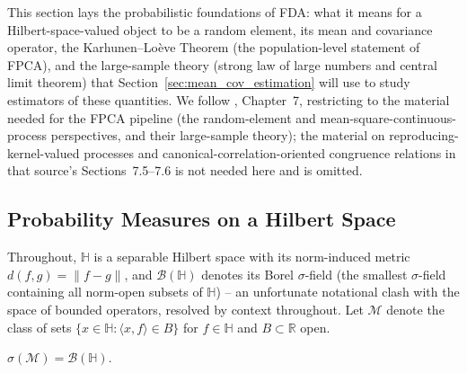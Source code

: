This section lays the probabilistic foundations of FDA: what it means for
a Hilbert-space-valued object to be a random element, its mean and
covariance operator, the Karhunen--Lo\`eve Theorem (the population-level
statement of FPCA), and the large-sample theory (strong law of large
numbers and central limit theorem) that Section~\ref{sec:mean_cov_estimation}
will use to study estimators of these quantities. We follow
\cite{hsingeubank2015}, Chapter~7, restricting to the material needed for
the FPCA pipeline (the random-element and mean-square-continuous-process
perspectives, and their large-sample theory); the material on
reproducing-kernel-valued processes and canonical-correlation-oriented
congruence relations in that source's Sections~7.5--7.6 is not needed here
and is omitted.

\subsection{Probability Measures on a Hilbert Space}
\label{subsec:prob_measures}

Throughout, $\mathbb{H}$ is a separable Hilbert space with its norm-induced
metric $d(f,g)=\|f-g\|$, and $\mathcal{B}(\mathbb{H})$ denotes its Borel
$\sigma$-field (the smallest $\sigma$-field containing all norm-open
subsets of $\mathbb{H}$) -- an unfortunate notational clash with the space
of bounded operators, resolved by context throughout. Let $\mathcal{M}$
denote the class of sets $\{x\in\mathbb{H}:\langle x,f\rangle\in B\}$ for
$f\in\mathbb{H}$ and $B\subset\mathbb{R}$ open.

\begin{theorem}
\label{thm:borel_sigma_field}
$\sigma(\mathcal{M})=\mathcal{B}(\mathbb{H})$.
\end{theorem}

